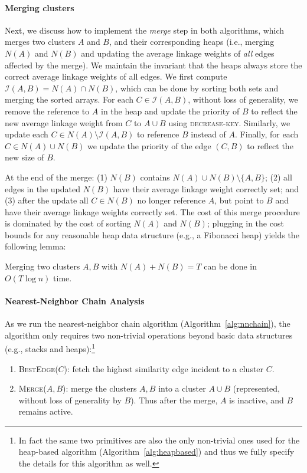 \paragraph{Merging clusters}
Next, we discuss how to implement the {\em merge} step in both algorithms, which merges two clusters $A$ and $B$, and their corresponding heaps (i.e., merging $N(A)$ and $N(B)$ and updating the average linkage weights of {\em all} edges affected by the merge).
We maintain the invariant that the heaps always store the correct average linkage weights of all edges.
We first compute $\mathcal{I}(A,B) = N(A) \cap N(B)$, which can be done by sorting both sets and merging the sorted arrays.
For each $C \in \mathcal{I}(A, B)$, without loss of generality, we remove the reference to $A$ in the heap and update the priority of $B$ to reflect the new average linkage weight from $C$ to $A \cup B$ using \textsc{decrease-key}.
Similarly, we update each $C \in N(A) \setminus \mathcal{I}(A, B)$ to reference $B$ instead of $A$.
Finally, for each $C \in N(A) \cup N(B)$ we update the priority of the edge $(C, B)$ to reflect the new size of $B$.

At the end of the merge: (1) $N(B)$ contains $N(A) \cup N(B) \setminus \{A, B\}$; (2) all edges in the updated $N(B)$ have their average linkage weight correctly set; and (3) after the update all $C \in N(B)$ no longer reference $A$, but point to $B$ and have their average linkage weights correctly set.
%
The cost of this merge procedure is dominated by the cost of sorting $N(A)$ and $N(B)$; plugging in the cost bounds for any reasonable heap data structure (e.g., a Fibonacci heap) yields the following lemma:
\begin{lemma}\label{lem:merge}
Merging two clusters $A,B$ with $N(A) + N(B) = T$ can be done in $O(T \log n)$ time.
\end{lemma}


\paragraph{Nearest-Neighbor Chain Analysis}
As we run the nearest-neighbor chain algorithm (Algorithm~\ref{alg:nnchain}), the algorithm only requires two non-trivial operations beyond basic data structures (e.g., stacks and heaps):\footnote{In fact the same two primitives are also the only non-trivial ones used for the heap-based algorithm (Algorithm~\ref{alg:heapbased}) and thus we fully specify the details for this algorithm as well.}
\begin{enumerate}
  \item \textsc{BestEdge}($C$): fetch the highest similarity edge incident to a cluster $C$.
  \item \textsc{Merge}($A, B$): merge the clusters $A,B$ into a cluster $A \cup B$ (represented, without loss of generality by $B$). Thus after the merge, $A$ is inactive, and $B$ remains active.
\end{enumerate}

